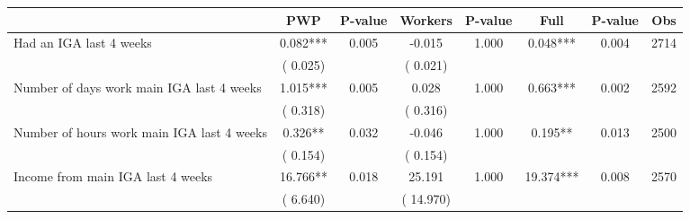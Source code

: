 
\begin{tabular}{l*{7}{c}}\hline&\multicolumn{1}{c}{PWP}&\multicolumn{1}{c}{P-value}&\multicolumn{1}{c}{Workers}&\multicolumn{1}{c}{P-value}&\multicolumn{1}{c}{Full}&\multicolumn{1}{c}{P-value}&\multicolumn{1}{c}{Obs} \\ \hline

 Had an IGA last 4 weeks       &              0.082***       &        0.005  &             -0.015       &        1.000  &              0.048***       &              0.004 &  2714 \\ 
                       &       (       0.025)             &                               &       (       0.021)                     &                               &                                               &                                &                      \\ 

 Number of days work main IGA last 4 weeks       &              1.015***       &        0.005  &              0.028       &        1.000  &              0.663***       &              0.002 &  2592 \\ 
                       &       (       0.318)             &                               &       (       0.316)                     &                               &                                               &                                &                      \\ 

 Number of hours work main IGA last 4 weeks       &              0.326**       &        0.032  &             -0.046       &        1.000  &              0.195**       &              0.013 &  2500 \\ 
                       &       (       0.154)             &                               &       (       0.154)                     &                               &                                               &                                &                      \\ 

 Income from main IGA last 4 weeks       &             16.766**       &        0.018  &             25.191       &        1.000  &             19.374***       &              0.008 &  2570 \\ 
                       &       (       6.640)             &                               &       (      14.970)                     &                               &                                               &                                &                      \\ 


\end{tabular}
